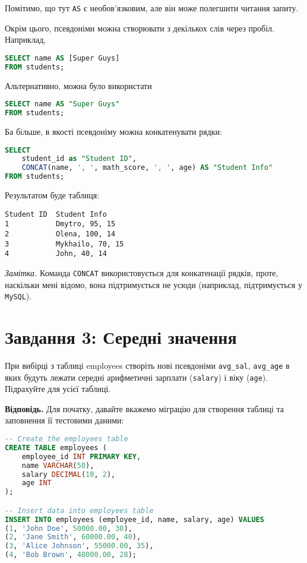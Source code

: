 \documentclass{hw_template}
\begin{document}
Помітимо, що тут \texttt{AS} є необов'язковим, але він може полегшити читання
запиту.

Окрім цього, псевдоніми можна створювати з декількох слів через пробіл.
Наприклад,
\begin{lstlisting}[language=SQL]
SELECT name AS [Super Guys]
FROM students; 
\end{lstlisting}

Альтернативно, можна було використати
\begin{lstlisting}[language=SQL]
SELECT name AS "Super Guys"
FROM students;
\end{lstlisting}

Ба більше, в якості псевдоніму можна конкатенувати рядки:
\begin{lstlisting}[language=SQL]
SELECT 
    student_id as "Student ID", 
    CONCAT(name, ', ', math_score, ', ', age) AS "Student Info"
FROM students;
\end{lstlisting}

Результатом буде таблиця:
\begin{lstlisting}
Student ID 	Student Info
1 	        Dmytro, 95, 15
2 	        Olena, 100, 14
3 	        Mykhailo, 70, 15
4 	        John, 40, 14
\end{lstlisting}

\textit{Замітка.} Команда \texttt{CONCAT} використовується для конкатенації
рядків, проте, наскільки мені відомо, вона підтримується не усюди (наприклад,
підтримується у \texttt{MySQL}).

\newpage

\section{Завдання 3: Середні значення}

\begin{problem}
При вибірці з таблиці employees створіть нові псевдоніми \texttt{avg\_sal},
\texttt{avg\_age} в яких будуть лежати середні арифметичні зарплати
(\texttt{salary}) і віку (\texttt{age}). Підрахуйте для усієї таблиці.
\end{problem}

\textbf{Відповідь.} Для початку, давайте вкажемо міграцію для створення таблиці
та заповнення її тестовими даними:
\begin{lstlisting}[language=SQL]
-- Create the employees table
CREATE TABLE employees (
    employee_id INT PRIMARY KEY,
    name VARCHAR(50),
    salary DECIMAL(10, 2),
    age INT
);

-- Insert data into employees table
INSERT INTO employees (employee_id, name, salary, age) VALUES
(1, 'John Doe', 50000.00, 30),
(2, 'Jane Smith', 60000.00, 40),
(3, 'Alice Johnson', 55000.00, 35),
(4, 'Bob Brown', 48000.00, 28);
\end{lstlisting}
\end{document}
